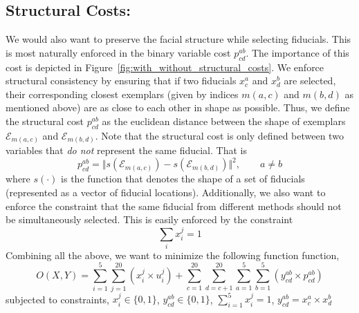 \subsection{Structural Costs:} We would also want to preserve the facial structure while selecting fiducials. This is most
naturally enforced in the binary variable cost $p^{ab}_{cd}$. 
The importance of this cost is depicted in Figure~\ref{fig:with_without_structural_costs}.
We enforce structural consistency by ensuring that if
two fiducials $x^a_c$ and $x^b_d$ are selected, their corresponding closest exemplars (given
by indices $m(a,c)$ and $m(b,d)$ as mentioned above) are as close to each other in shape as
possible. Thus, we define the structural cost $p^{ab}_{cd}$ as the euclidean distance between
the shape of exemplars $\mathcal{E}_{m(a,c)}$ and $\mathcal{E}_{m(b,d)}$. Note that the structural
cost is only defined between two variables that \emph{do not} represent the same fiducial. 
That is
\begin{equation}
  p^{ab}_{cd} = \Vert s(\mathcal{E}_{m(a,c)}) - s(\mathcal{E}_{m(b,d)}) \Vert^2, \qquad a \ne b
\end{equation}
where $s(\cdot)$ is the function that denotes the shape of a set of fiducials (represented as a
vector of fiducial locations).
Additionally, we also want to enforce the constraint that the same fiducial from different methods
should not be simultaneously selected. This is easily enforced by the constraint
\begin{equation}
  \sum_i x^j_i = 1
\end{equation}
Combining all the above, we want to minimize the following function function,
\begin{equation}
O(X,Y) = \sum_{i=1}^{5} \sum_{j=1}^{20} (x^j_i \times u_i^j) + \sum_{c=1}^{20} \sum_{d=c+1}^{20} \sum_{a=1}^{5} \sum_{b=1}^{5} (y_{cd}^{ab} \times p_{cd}^{ab})
\end{equation}
subjected to constraints,
$x_i^j \in \{0,1\}$, $y_{cd}^{ab} \in \{0,1\}$, $\sum_{i=1}^5 x_i^j = 1$, $y_{cd}^{ab} = x_c^a \times x_d^b$



